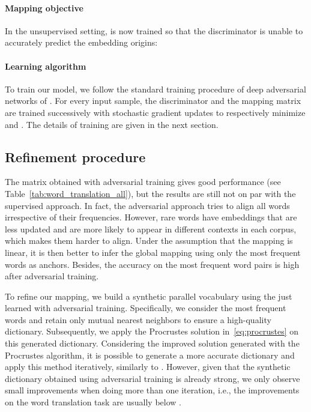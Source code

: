 \documentclass{article} \usepackage{iclr2018_conference,times}
\begin{document}
\paragraph{Mapping objective} In the unsupervised setting,  is now trained so that the discriminator is unable to accurately predict the embedding origins:


\paragraph{Learning algorithm} To train our model, we follow the standard training procedure of deep adversarial networks of \cite{goodfellow2014generative}. For every input sample, the discriminator and the mapping matrix  are trained successively with stochastic gradient updates to respectively minimize  and . The details of training are given in the next section.

\subsection{Refinement procedure}
\label{refinement}
The matrix  obtained with adversarial training gives good performance (see Table~\ref{tab:word_translation_all}), but the results are still not on par with the supervised approach. In fact, the adversarial approach tries to align all words irrespective of their frequencies. However, rare words have embeddings that are less updated and are more likely to appear in different contexts in each corpus, which makes them harder to align. Under the assumption that the mapping is linear, it is then better to infer the global mapping using only the most frequent words as anchors. Besides, the accuracy on the most frequent word pairs is high after adversarial training.

To refine our mapping, we build a synthetic parallel vocabulary using the  just learned with adversarial training. Specifically, we consider the most frequent words and retain only mutual nearest neighbors to ensure a high-quality dictionary. Subsequently, we apply the Procrustes solution in~\eqref{eq:procrustes} on this generated dictionary. Considering the improved solution generated with the Procrustes algorithm, it is possible to generate a more accurate dictionary and apply this method iteratively, similarly to \cite{artetxe}. However, given that the synthetic dictionary obtained using adversarial training is already strong, we only observe small improvements when doing more than one iteration, i.e., the improvements on the word translation task are usually below .
\end{document}
